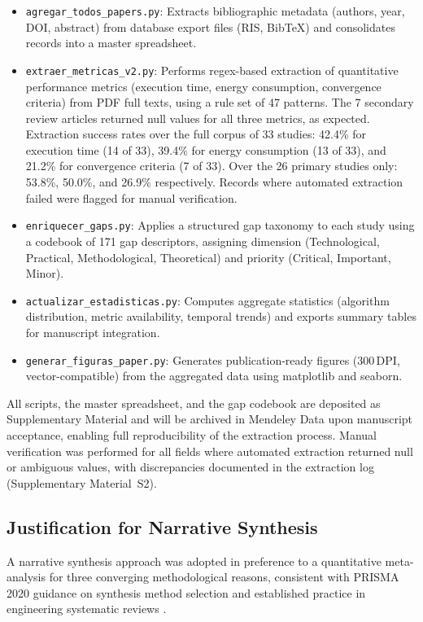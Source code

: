 \documentclass[review,3p,times]{elsarticle}
\begin{document}
\begin{itemize}
  \item \texttt{agregar\_todos\_papers.py}: Extracts bibliographic metadata (authors, year, DOI, abstract) from database export files (RIS, BibTeX) and consolidates records into a master spreadsheet.
  \item \texttt{extraer\_metricas\_v2.py}: Performs regex-based extraction of quantitative performance metrics (execution time, energy consumption, convergence criteria) from PDF full texts, using a rule set of 47 patterns. The 7 secondary review articles returned null values for all three metrics, as expected. Extraction success rates over the full corpus of 33 studies: 42.4\% for execution time (14 of 33), 39.4\% for energy consumption (13 of 33), and 21.2\% for convergence criteria (7 of 33). Over the 26 primary studies only: 53.8\%, 50.0\%, and 26.9\% respectively. Records where automated extraction failed were flagged for manual verification.
  \item \texttt{enriquecer\_gaps.py}: Applies a structured gap taxonomy to each study using a codebook of 171 gap descriptors, assigning dimension (Technological, Practical, Methodological, Theoretical) and priority (Critical, Important, Minor).
  \item \texttt{actualizar\_estadisticas.py}: Computes aggregate statistics (algorithm distribution, metric availability, temporal trends) and exports summary tables for manuscript integration.
  \item \texttt{generar\_figuras\_paper.py}: Generates publication-ready figures (300\,DPI, vector-compatible) from the aggregated data using matplotlib and seaborn.
\end{itemize}

All scripts, the master spreadsheet, and the gap codebook are deposited as Supplementary Material and will be archived in Mendeley Data upon manuscript acceptance, enabling full reproducibility of the extraction process. Manual verification was performed for all fields where automated extraction returned null or ambiguous values, with discrepancies documented in the extraction log (Supplementary Material~S2).

\subsection{Justification for Narrative Synthesis}
\label{subsec:narrative_synthesis}

A narrative synthesis approach was adopted in preference to a quantitative meta-analysis for three converging methodological reasons, consistent with PRISMA 2020 guidance on synthesis method selection \cite{page2021} and established practice in engineering systematic reviews \cite{brambilla2013}.
\end{document}

